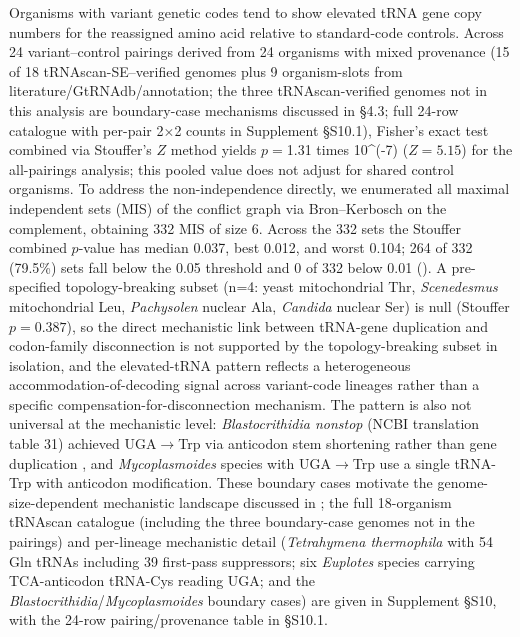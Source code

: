 \documentclass[preprint,11pt,authoryear,a4paper]{elsarticle}
\begin{document}
Organisms with variant genetic codes tend to show elevated tRNA gene
copy numbers for the reassigned amino acid relative to standard-code
controls. Across 24 variant--control pairings derived from 24 organisms
with mixed provenance (15 of 18 tRNAscan-SE--verified genomes plus 9
organism-slots from literature/GtRNAdb/annotation; the three
tRNAscan-verified genomes not in this analysis are boundary-case
mechanisms discussed in §4.3; full 24-row catalogue with per-pair 2\ensuremath{\times}2
counts in Supplement §S10.1), Fisher's exact test combined via
Stouffer's \(Z\) method yields \(p =\)1.31 times 10\^{}(-7)\(\)
(\(Z = 5.15\)) for the all-pairings analysis; this pooled value does not
adjust for shared control organisms. To address the non-independence
directly, we enumerated all maximal independent sets (MIS) of the
conflict graph via Bron--Kerbosch on the complement, obtaining 332 MIS
of size 6. Across the 332 sets the Stouffer combined \(p\)-value has
median 0.037, best 0.012, and worst 0.104; 264 of 332 (79.5\%) sets fall
below the 0.05 threshold and 0 of 332 below 0.01
(). A pre-specified topology-breaking subset (n=4:
yeast mitochondrial Thr, \emph{Scenedesmus} mitochondrial Leu,
\emph{Pachysolen} nuclear Ala, \emph{Candida} nuclear Ser) is null
(Stouffer \(p = 0.387\)), so the direct mechanistic link between
tRNA-gene duplication and codon-family disconnection is not supported by
the topology-breaking subset in isolation, and the elevated-tRNA pattern
reflects a heterogeneous accommodation-of-decoding signal across
variant-code lineages rather than a specific
compensation-for-disconnection mechanism. The pattern is also not
universal at the mechanistic level: \emph{Blastocrithidia nonstop} (NCBI
translation table 31) achieved UGA\(\rightarrow\)Trp via anticodon stem
shortening rather than gene duplication \citep{kachale2023}, and
\emph{Mycoplasmoides} species with UGA\(\rightarrow\)Trp use a single
tRNA-Trp with anticodon modification. These boundary cases motivate the
genome-size-dependent mechanistic landscape discussed in
; the full 18-organism tRNAscan catalogue
(including the three boundary-case genomes not in the pairings) and
per-lineage mechanistic detail (\emph{Tetrahymena thermophila} with 54
Gln tRNAs including 39 first-pass suppressors; six \emph{Euplotes}
species carrying TCA-anticodon tRNA-Cys reading UGA; and the
\emph{Blastocrithidia}/\emph{Mycoplasmoides} boundary cases) are given
in Supplement §S10, with the 24-row pairing/provenance table in §S10.1.
\end{document}
